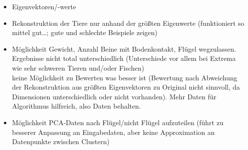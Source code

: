  \begin{itemize}
  \item Eigenvektoren/-werte
  \item Rekonstruktion der Tiere nur anhand der größten Eigenwerte (funktioniert so mittel gut\dots; gute und schlechte Beispiele zeigen)
  \item Möglichkeit Gewicht, Anzahl Beine mit Bodenkontakt, Flügel wegzulassen. Ergebnisse nicht total unterschiedlich (Unterschiede vor allem bei Extrema wie sehr schweren Tieren und/oder Fischen)\\
  keine Möglichkeit zu Bewerten was besser ist (Bewertung nach Abweichung der Rekonstruktion aus größten Eigenvektoren zu Original nicht sinnvoll, da Dimensionen unterschiedlich oder nicht vorhanden). Mehr Daten für Algorithmus hilfreich, also Daten behalten.
  \item Möglichkeit PCA-Daten nach Flügel/nicht Flügel aufzuteilen (führt zu besserer Anpassung an Eingabedaten, aber keine Approximation an Datenpunkte zwischen Clustern) 
 \end{itemize}
 


